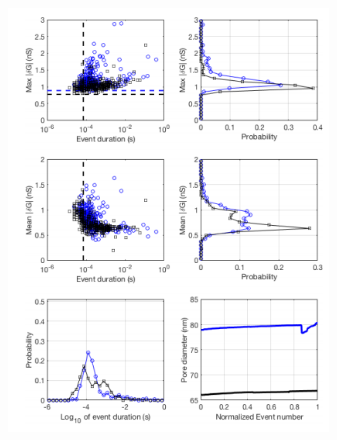 \documentclass{article}
\begin{document}
\begin{landscape}
\begin{multicols}{3}
 \includegraphics[width=8.5cm, height=20cm]{1} %
  
  \end{multicols}
  \end{landscape}
  
\end{document}
